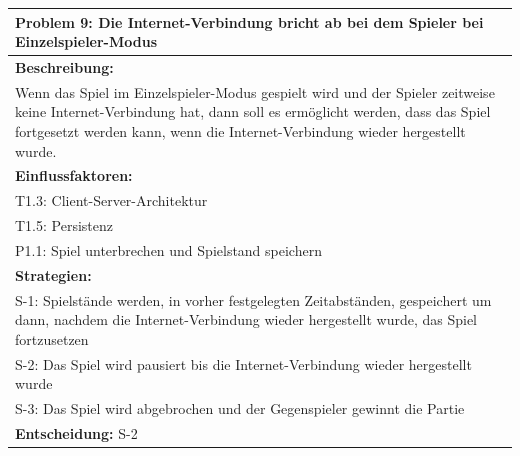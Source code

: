 \documentclass[fontsize=12pt,paper=a4,twoside]{scrartcl}
\begin{document}
\begin{longtable}{|p{15cm}|}
\hline
Problem 9: Die Internet-Verbindung bricht ab bei dem Spieler bei Einzelspieler-Modus                                                                       
\\ \hline                                                                                                                                                                                                                                                                                                                                                                                                                                                                                                                                                        
\textbf{Beschreibung:} \\
Wenn das Spiel im Einzelspieler-Modus gespielt wird und der Spieler zeitweise keine Internet-Verbindung hat, 
dann soll es ermöglicht werden, dass das Spiel fortgesetzt werden kann, wenn die Internet-Verbindung wieder hergestellt wurde.
\\ \hline
\textbf{Einflussfaktoren:} \\
T1.3: Client-Server-Architektur \\
T1.5: Persistenz \\
P1.1: Spiel unterbrechen und Spielstand speichern
\\ \hline
\textbf{Strategien:} \\
S-1: Spielstände werden, in vorher festgelegten Zeitabständen, gespeichert um dann, nachdem die Internet-Verbindung wieder hergestellt wurde, das Spiel fortzusetzen\\
S-2: Das Spiel wird pausiert bis die Internet-Verbindung wieder hergestellt wurde \\
S-3: Das Spiel wird abgebrochen und der Gegenspieler gewinnt die Partie
 \\ \hline
 \textbf{Entscheidung:} S-2
\\ \hline
\end{longtable}
\newpage
\end{document}
